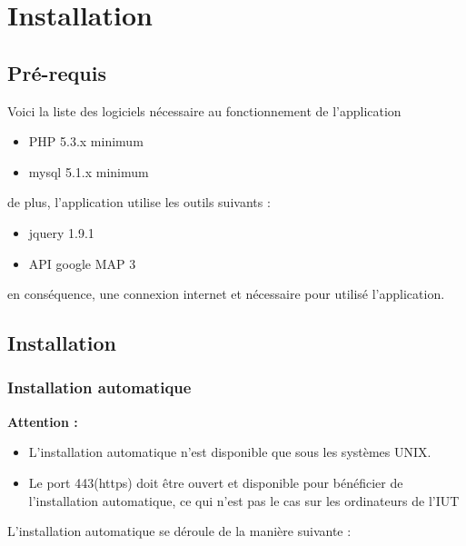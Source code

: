 \documentclass[a4paper,10pt]{report}
\begin{document}
\chapter{Installation}

\section{Pr\'e-requis}
Voici la liste des logiciels n\'ecessaire au fonctionnement de l'application

\begin{itemize}
    \item PHP 5.3.x minimum
    \item mysql 5.1.x minimum
\end{itemize}

\null

de plus, l'application utilise les outils suivants :

\begin{itemize}
    \item jquery 1.9.1
    \item API google MAP 3
\end{itemize}

\null

en cons\'equence, une connexion internet et n\'ecessaire pour utilis\'e
l'application.


\section{Installation}

\subsection{Installation automatique}

\textbf{Attention :} 
\begin{itemize}
    \item L'installation automatique n'est disponible que sous les syst\`emes UNIX.
    \item Le port 443(https) doit \^etre ouvert et disponible pour b\'en\'eficier
    de l'installation automatique, ce qui n'est pas le cas sur les ordinateurs de l'IUT
\end{itemize}

\null

L'installation automatique se d\'eroule de la mani\`ere suivante :
\end{document}
